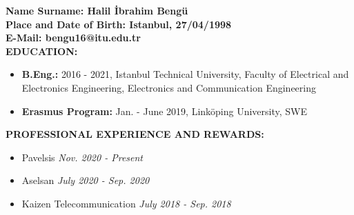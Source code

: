\textbf{Name Surname: {\normalfont Halil İbrahim Bengü}} \\

\vspace{-3mm}
\textbf{Place and Date of Birth: {\normalfont Istanbul, 27/04/1998}} \\

\vspace{-3mm}
\textbf{E-Mail: {\normalfont bengu16@itu.edu.tr}} \\


\textbf{EDUCATION:}
\vspace{-3mm}
\begin{itemize}
  \item \textbf{B.Eng.:} 2016 - 2021, Istanbul Technical University, Faculty of Electrical and Electronics Engineering, Electronics and Communication Engineering
  \item \textbf{Erasmus Program:} Jan. - June 2019, Linköping University, SWE
\end{itemize}

\textbf{PROFESSIONAL EXPERIENCE AND REWARDS:}
\vspace{-3mm}
\begin{itemize}
  \item Pavelsis \hfill \textit{Nov. 2020 - Present}
  \item Aselsan \hfill \textit{July 2020 - Sep. 2020}
  \item Kaizen Telecommunication \hfill \textit{July 2018 - Sep. 2018}
\end{itemize}


\vspace{-3mm}

